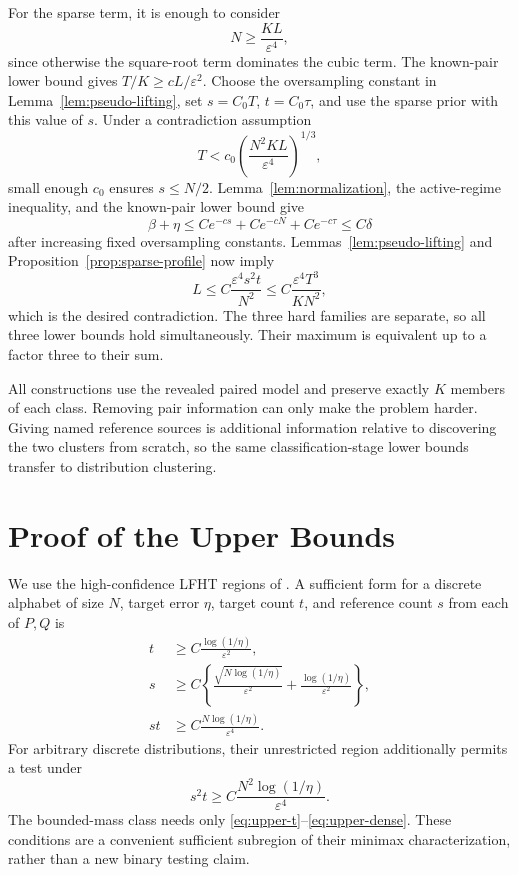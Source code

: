 \documentclass{article}
\begin{document}
For the sparse term, it is enough to consider
\[
N\geq\frac{KL}{\varepsilon^4},
\]
since otherwise the square-root term dominates the cubic term. The known-pair lower bound gives $T/K\geq cL/\varepsilon^2$. Choose the oversampling constant in Lemma~\ref{lem:pseudo-lifting}, set $s=C_0T$, $t=C_0\tau$, and use the sparse prior with this value of $s$. Under a contradiction assumption
\[
T<c_0\left(\frac{N^2KL}{\varepsilon^4}\right)^{1/3},
\]
small enough $c_0$ ensures $s\leq N/2$. Lemma~\ref{lem:normalization}, the active-regime inequality, and the known-pair lower bound give
\[
\beta+\eta\leq Ce^{-cs}+Ce^{-cN}+Ce^{-c\tau}\leq C\delta
\]
after increasing fixed oversampling constants. Lemmas~\ref{lem:pseudo-lifting} and Proposition~\ref{prop:sparse-profile} now imply
\[
L\leq C\frac{\varepsilon^4s^2t}{N^2}
\leq C\frac{\varepsilon^4T^3}{KN^2},
\]
which is the desired contradiction. The three hard families are separate, so all three lower bounds hold simultaneously. Their maximum is equivalent up to a factor three to their sum.

All constructions use the revealed paired model and preserve exactly $K$ members of each class. Removing pair information can only make the problem harder. Giving named reference sources is additional information relative to discovering the two clusters from scratch, so the same classification-stage lower bounds transfer to distribution clustering.

\section{Proof of the Upper Bounds}

We use the high-confidence LFHT regions of \citet{gerber2023classification}. A sufficient form for a discrete alphabet of size $N$, target error $\eta$, target count $t$, and reference count $s$ from each of $P,Q$ is
\begin{align}
t&\geq C\frac{\log(1/\eta)}{\varepsilon^2},
\label{eq:upper-t}\\
s&\geq C\left\{\frac{\sqrt{N\log(1/\eta)}}{\varepsilon^2}+\frac{\log(1/\eta)}{\varepsilon^2}\right\},
\label{eq:upper-s}\\
st&\geq C\frac{N\log(1/\eta)}{\varepsilon^4}.
\label{eq:upper-dense}
\end{align}
For arbitrary discrete distributions, their unrestricted region additionally permits a test under
\begin{equation}
s^2t\geq C\frac{N^2\log(1/\eta)}{\varepsilon^4}.
\label{eq:upper-sparse}
\end{equation}
The bounded-mass class needs only \eqref{eq:upper-t}--\eqref{eq:upper-dense}. These conditions are a convenient sufficient subregion of their minimax characterization, rather than a new binary testing claim.
\end{document}
